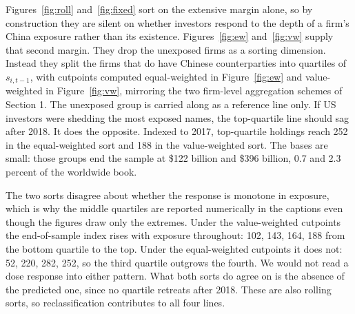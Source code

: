 \documentclass[11pt]{article}
\begin{document}
Figures~\ref{fig:roll} and~\ref{fig:fixed} sort on the extensive margin alone,
so by construction they are silent on whether investors respond to the depth of
a firm's China exposure rather than its existence.
Figures~\ref{fig:ew} and~\ref{fig:vw} supply that second margin. They drop the
unexposed firms as a sorting dimension. Instead they split the firms that do have
Chinese counterparties into quartiles of $s_{i,t-1}$, with cutpoints computed
equal-weighted in Figure~\ref{fig:ew} and value-weighted in Figure~\ref{fig:vw},
mirroring the two firm-level aggregation schemes of Section 1. The unexposed group
is carried along as a reference line only. If US investors were shedding
the most exposed names, the top-quartile line should sag after 2018. It does the
opposite. Indexed to 2017, top-quartile holdings reach 252 in the equal-weighted
sort and 188 in the value-weighted sort. The bases are small: those groups end the
sample at \$122 billion and \$396 billion, 0.7 and 2.3 percent of the worldwide
book.

The two sorts disagree about whether the response is monotone in exposure, which
is why the middle quartiles are reported numerically in the captions even though
the figures draw only the extremes.
Under the value-weighted cutpoints the end-of-sample index rises with exposure
throughout: 102, 143, 164, 188 from the bottom quartile to the top. Under the
equal-weighted cutpoints it does not: 52, 220, 282, 252, so the third quartile
outgrows the fourth. We would not read a dose response into either pattern. What
both sorts do agree on is the absence of the predicted one, since no quartile
retreats after 2018. These are also rolling sorts, so reclassification
contributes to all four lines.
\end{document}
